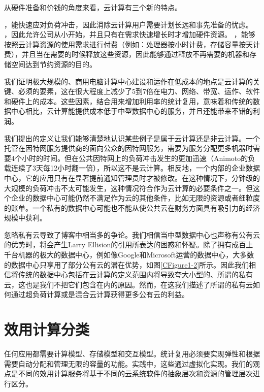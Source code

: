 
从硬件准备和价钱的角度来看，云计算有三个新的特点。
\begin{itemize}
，能快速应对负荷冲击，因此消除云计算用户需要计划长远和事先准备的忧虑。
，因此允许公司从小开始，并且只有在需求快速增长时才增加硬件资源。
，能够按照云计算资源的使用需求进行付费（例如：处理器按小时计费，存储容量按天计费），并且当在需要的时候释放这些资源，因此能够通过释放不再需要的机器和存储空间达到节约资源的目的。
\end{itemize}

我们证明极大规模的、商用电脑计算中心建设和运作在低成本的地点是云计算的关键、必须的要素，这在很大程度上减少了5到7倍在电力、网络、带宽、运作、软件和硬件上的成本。这些因素，结合用来增加利用率的统计复用，意味着和传统的数据中心相比，云计算能提供成本低于中型数据中心的服务，并且还能带来不错的利润。

我们提出的定义让我们能够清楚地认识某些例子是属于云计算还是非云计算。一个托管在因特网服务提供商的面向公众的因特网服务，需要为服务分配更多机器时需要4个小时的时间。但在公共因特网上的负荷冲击发生的更加迅速（Animoto的负载连续了3天每12小时翻一倍），所以这不是云计算。相反地，一个内部的企业数据中心，它的应用只有在显著提前通知管理员时才被修改。在这种情况下，分钟级的大规模的负荷冲击不太可能发生，这种情况符合作为云计算的必要条件之一。但这个企业的数据中心可能仍然不满足作为云的其他条件，比如无限的资源或者细粒度的账单。一个私有的数据中心可能也不能从使公共云在财务方面具有吸引力的经济规模中获利。

忽略私有云导致了博客中相当多的争论。我们相信当中型数据中心也声称有公有云的优势时，将会产生Larry Ellision的引用所表达的困惑和怀疑。除了拥有成百上千台机器的极大的数据中心，例如像Google和Microsoft运营的数据中心，大多数的数据中心只享用了部分公有云的潜在优势，如图\ref{CFigure1-2}所示。因此我们相信将传统的数据中心包括在云计算的定义范围内将导致夸大小型的、所谓的私有云，这也是我们不把它们包含在内的原因。然而，在这我们描述了所谓的私有云如何通过超负荷计算或是混合云计算获得更多公有云的利益。


\section{效用计算分类}

任何应用都需要计算模型、存储模型和交互模型。统计复用必须要实现弹性和根据需要自动分配和管理无限的容量的功能。实践中，这些通过虚拟化实现。我们的观点是不同的效用计算服务将基于不同的云系统软件的抽象层次和资源的管理层次进行区分。

